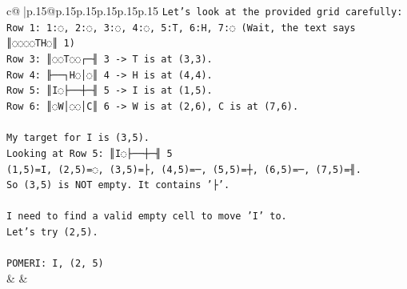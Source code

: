 \documentclass{article}
\begin{document}
{\begin{supertabular}{c@{$\;$}|p{.15\linewidth}@{}p{.15\linewidth}p{.15\linewidth}p{.15\linewidth}p{.15\linewidth}p{.15\linewidth}}
{{{\texttt{Let's look at the provided grid carefully:} \\
\texttt{Row 1: 1:◌, 2:◌, 3:◌, 4:◌, 5:T, 6:H, 7:◌ (Wait, the text says ║◌◌◌◌TH◌║ 1)} \\
\texttt{Row 3: ║◌◌T◌◌┌─╢ 3 {-}> T is at (3,3).} \\
\texttt{Row 4: ╟──┐H◌│◌║ 4 {-}> H is at (4,4).} \\
\texttt{Row 5: ║I◌├──┼─╢ 5 {-}> I is at (1,5).} \\
\texttt{Row 6: ║◌W│◌◌│C║ 6 {-}> W is at (2,6), C is at (7,6).} \\
\\ 
\texttt{My target for I is (3,5).} \\
\texttt{Looking at Row 5: ║I◌├──┼─╢ 5} \\
\texttt{(1,5)=I, (2,5)=◌, (3,5)=├, (4,5)=─, (5,5)=┼, (6,5)=─, (7,5)=╢.} \\
\texttt{So (3,5) is NOT empty. It contains '├'.} \\
\\ 
\texttt{I need to find a valid empty cell to move 'I' to.} \\
\texttt{Let's try (2,5).} \\
\\ 
\texttt{POMERI: I, (2, 5)} \\
            }
        }
    }
    & & \\ \\


\end{supertabular}}
\end{document}
